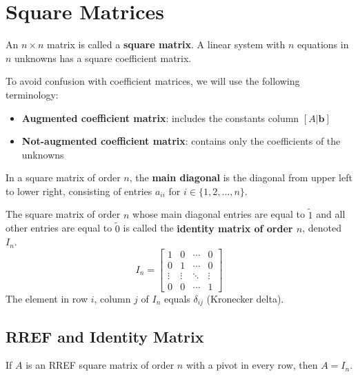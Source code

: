 
\section{Square Matrices}
An $n \times n$ matrix is called a \textbf{square matrix}. A linear system with $n$ equations in $n$ unknowns has a square coefficient matrix.

\begin{notation}
    To avoid confusion with coefficient matrices, we will use the following terminology:
    \begin{itemize}
        \item \textbf{Augmented coefficient matrix}: includes the constants column $[A | \mathbf{b}]$
        \item \textbf{Not-augmented coefficient matrix}: contains only the coefficients of the unknowns
    \end{itemize}
\end{notation}

In a square matrix of order $n$, the \textbf{main diagonal} is the diagonal from upper left to lower right, consisting of entries $a_{ii}$ for $i \in \{1, 2, \ldots, n\}$.

\begin{definition}\label{def:identity-matrix}
    The square matrix of order $n$ whose main diagonal entries are equal to $\tilde{1}$ and all other entries are equal to $\tilde{0}$ is called the \textbf{identity matrix of order $n$}, denoted $I_n$.
    \[
        I_n = \begin{bmatrix}
            1 & 0 & \cdots & 0 \\
            0 & 1 & \cdots & 0 \\
            \vdots & \vdots & \ddots & \vdots \\
            0 & 0 & \cdots & 1
        \end{bmatrix}
    \]
    The element in row $i$, column $j$ of $I_n$ equals $\delta_{ij}$ (Kronecker delta).
\end{definition}

\subsection{RREF and Identity Matrix}

\begin{theorem}\label{thm:rref-square-identity}
    If $A$ is an RREF square matrix of order $n$ with a pivot in every row, then $A = I_n$.
\end{theorem}

